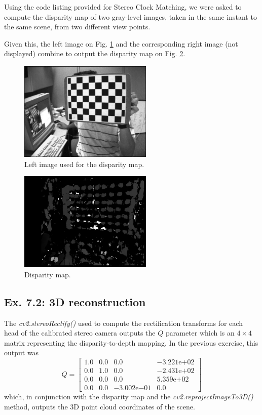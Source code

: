 \documentclass[journal]{IEEEtran}
\begin{document}
Using the code listing provided for Stereo Clock Matching, we were asked to compute the disparity map of two gray-level images, taken in the same instant to the same scene, from two different view points. 

Given this, the left image on Fig. \ref{fig:7.1_base} and the corresponding right image (not displayed) combine to output the disparity map on Fig. \ref{fig:7.1_disparity}.

\begin{figure}[htp]
  \centering
  \includegraphics[width=2.5in]{imgs/7.1_base.png}
  \caption{Left image used for the disparity map.}
  \label{fig:7.1_base}
\end{figure}
\FloatBarrier

\begin{figure}[htp]
  \centering
  \includegraphics[width=2.5in]{imgs/7.1_disparity.png}
  \caption{Disparity map.}
  \label{fig:7.1_disparity}
\end{figure}
\FloatBarrier

\subsection{Ex. 7.2: 3D reconstruction}

The \emph{cv2.stereoRectify()} used to compute the rectification transforms for each head of the calibrated stereo camera outputs the $Q$ parameter which is an $4 \times 4$ matrix representing the disparity-to-depth mapping. In the previous exercise, this output was
%
\begin{equation*}
  Q = 
  \begin{bmatrix}
    1.0 & 0.0 & 0.0 & -3.221\mathrm{e}{+02} \\
    0.0 & 1.0 & 0.0 & -2.431\mathrm{e}{+02} \\
    0.0 & 0.0 & 0.0 & 5.359\mathrm{e}{+02} \\
    0.0 & 0.0 & -3.002\mathrm{e}{-01} & 0.0
  \end{bmatrix}
\end{equation*}
%
which, in conjunction with the disparity map and the \emph{cv2.reprojectImageTo3D()} method, outputs the 3D point cloud coordinates of the scene. 
\end{document}
